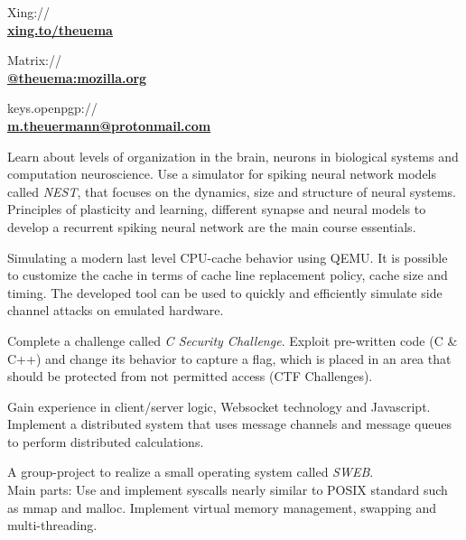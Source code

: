 \documentclass[]{resume}
\begin{document}
\begin{minipage}[t]{0.33\textwidth}
Xing://
\\\href{https://www.xing.com/profile/Mario_Theuermann}{\textbf{xing.to/theuema}} \medsep

Matrix://
\\\href{https://matrix.to/#/@theuema:mozilla.org}{\textbf{@theuema:mozilla.org}} \medsep

keys.openpgp://
\\\href{https://keys.openpgp.org/vks/v1/by-fingerprint/4BB961379C844A8F96DB6703B0A310EEC45021EC}{\textbf{m.theuermann@protonmail.com}} \medsep


\end{minipage}\quad %
\begin{minipage}[t]{0.66\textwidth} 
Learn about levels of organization in the brain, neurons in biological systems and computation neuroscience. Use a simulator for spiking neural network models called \textit{NEST}, that focuses on the dynamics, size and structure of neural systems. Principles of plasticity and learning, different synapse and neural models to develop a recurrent spiking neural network are the main course essentials. \sectionsep

Simulating a modern last level CPU-cache behavior using QEMU. It is possible to customize the cache in terms of cache line replacement policy, cache size and timing. The developed tool can be used to quickly and efficiently simulate side channel attacks on emulated hardware. \sectionsep

Complete a challenge called \textit{C Security Challenge}. Exploit pre-written code (C \& C++) and change its behavior to capture a flag, which is placed in an area that should be protected from not permitted access (CTF Challenges). \sectionsep

Gain experience in client/server logic, Websocket technology and Javascript. Implement a distributed system that uses message channels and message queues to perform distributed calculations. \sectionsep

A group-project to realize a small operating system called \textit{SWEB}. \\
Main parts: Use and implement syscalls nearly similar to POSIX standard such as mmap and malloc. Implement virtual memory management, swapping and multi-threading. \sectionsep

\end{minipage} 
\vfill \vfill \vfill \vfill
\end{document}
